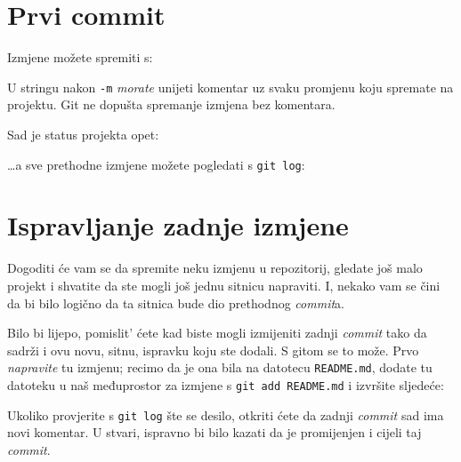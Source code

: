 
\section*{Prvi commit}

Izmjene možete spremiti s:


U stringu nakon \verb+-m+ \emph{morate} unijeti komentar uz svaku promjenu koju spremate na projektu.
Git ne dopušta spremanje izmjena bez komentara.

Sad je status projekta opet:



\dots{}a sve prethodne izmjene možete pogledati s \verb+git log+:



\section*{Ispravljanje zadnje izmjene}

Dogoditi će vam se da spremite neku izmjenu u repozitorij, gledate još malo projekt i shvatite da ste mogli još jednu sitnicu napraviti.
I, nekako vam se čini da bi bilo logično da ta sitnica bude dio prethodnog \emph{commit}a.

Bilo bi lijepo, pomislit' ćete kad biste mogli izmijeniti zadnji \emph{commit} tako da sadrži i ovu novu, sitnu, ispravku koju ste dodali.
S gitom se to može.
Prvo \emph{napravite} tu izmjenu; recimo da je ona bila na datotecu \verb+README.md+, dodate tu datoteku u naš međuprostor za izmjene s \verb+git add README.md+ i izvršite sljedeće:


Ukoliko provjerite s \verb+git log+ šte se desilo, otkriti ćete da zadnji \emph{commit} sad ima novi komentar.
U stvari, ispravno bi bilo kazati da je promijenjen i cijeli taj \emph{commit}.




